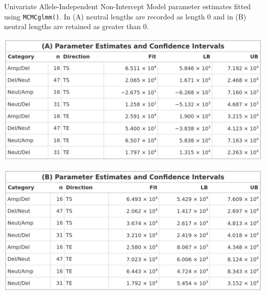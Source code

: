 \begin{table}[!htb]
    \caption[Univariate Allele-Independent Non-Intercept Model parameter estimates fitted using \texttt{MCMCglmm()}.]{Univariate Allele-Independent Non-Intercept Model parameter estimates fitted using \texttt{MCMCglmm()}. In (A) neutral lengths are recorded as length 0 and in (B) neutral lengths are retained as greater than 0.}
     \begin{subtable}[t]{.49\textwidth}
      \centering
      \includegraphics[width = 1\textwidth]{../tables/Chapter_5/Univariate_MCMC_6_AI_Pred.png}
    \end{subtable}%
    \hspace{0.5cm}
     \begin{subtable}[t]{.49\textwidth}
      \centering
         \includegraphics[width = 1\textwidth]{../tables/Chapter_5/Univariate_MCMC_6_Neut_AI_Pred.png}
    \end{subtable} 
\end{table}

